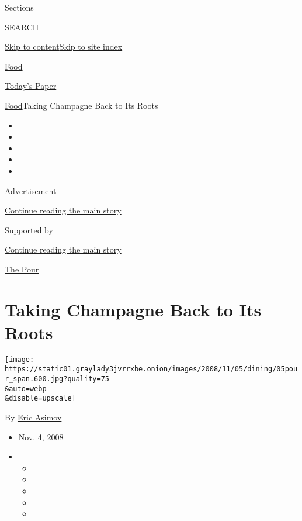Sections

SEARCH

\protect\hyperlink{site-content}{Skip to
content}\protect\hyperlink{site-index}{Skip to site index}

\href{https://www.nytimes3xbfgragh.onion/section/food}{Food}

\href{https://myaccount.nytimes3xbfgragh.onion/auth/login?response_type=cookie\&client_id=vi}{}

\href{https://www.nytimes3xbfgragh.onion/section/todayspaper}{Today's
Paper}

\href{/section/food}{Food}\textbar{}Taking Champagne Back to Its Roots

\begin{itemize}
\item
\item
\item
\item
\item
\end{itemize}

Advertisement

\protect\hyperlink{after-top}{Continue reading the main story}

Supported by

\protect\hyperlink{after-sponsor}{Continue reading the main story}

\href{/column/the-pour}{The Pour}

\hypertarget{taking-champagne-back-to-its-roots}{%
\section{Taking Champagne Back to Its
Roots}\label{taking-champagne-back-to-its-roots}}

\texttt{[image: https://static01.graylady3jvrrxbe.onion/images/2008/11/05/dining/05pour\_span.600.jpg?quality=75\\\&auto=webp\\\&disable=upscale]}

By \href{https://www.nytimes3xbfgragh.onion/by/eric-asimov}{Eric Asimov}

\begin{itemize}
\item
  Nov. 4, 2008
\item
  \begin{itemize}
  \item
  \item
  \item
  \item
  \item
  \end{itemize}
\end{itemize}

